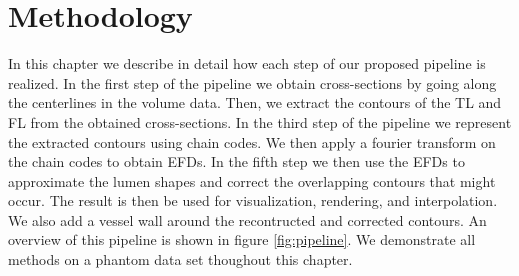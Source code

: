 \documentclass[thesis.tex]{subfiles}
\begin{document}
\chapter{Methodology}\label{chap:basics}

In this chapter we describe in detail how each step of our proposed pipeline is realized. In the first step of the pipeline we obtain cross-sections by going along the centerlines in the volume data. Then, we extract the contours of the TL and FL from the obtained cross-sections. In the third step of the pipeline we represent the extracted contours using chain codes. We then apply a fourier transform on the chain codes to obtain EFDs. In the fifth step we then use the EFDs to approximate the lumen shapes and correct the overlapping contours that might occur. The result is then be used for visualization, rendering, and interpolation. We also add a vessel wall around the recontructed and corrected contours. An overview of this pipeline is shown in figure \ref{fig:pipeline}. We demonstrate all methods on a phantom data set thoughout this chapter. 

\begin{center}
\end{center}
\end{document}
